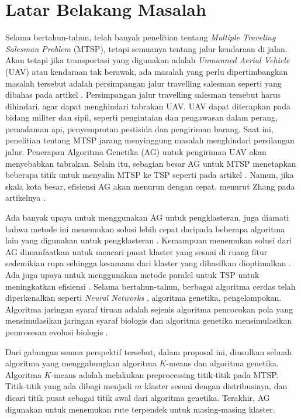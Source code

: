 \section{Latar Belakang Masalah}

Selama bertahun-tahun, telah banyak penelitian tentang \textit{Multiple Traveling Salesman Problem} (MTSP), tetapi semuanya tentang jalur kendaraan di jalan. Akan tetapi jika transportasi yang digunakan adalah \textit{Unmanned Aerial Vehicle} (UAV) atau kendaraan tak berawak, ada masalah yang perlu dipertimbangkan masalah tersebut adalah persimpangan jalur travelling salesman seperti yang dibahas pada artikel \cite{inproceedings}. Persimpangan jalur travelling salesman tersebut harus dihindari, agar dapat menghindari tabrakan UAV. UAV dapat diterapkan pada bidang militer dan sipil, seperti pengintaian dan pengawasan dalam perang, pemadaman api, penyemprotan pestisida dan pengiriman barang.
Saat ini, penelitian tentang MTSP jarang menyinggung masalah menghindari persilangan jalur. Penerapan Algoritma Genetika (AG) untuk pengiriman UAV akan menyebabkan tabrakan. Selain itu, sebagian besar AG untuk MTSP menetapkan beberapa titik untuk menyalin MTSP ke TSP seperti pada artikel \cite{shengping2002hybrid}. Namun, jika skala kota besar, efisiensi AG akan menurun dengan cepat, menurut Zhang pada artikelnya \cite{zhang2014parallel}.

Ada banyak upaya untuk menggunakan AG untuk pengklasteran, juga diamati bahwa metode ini menemukan solusi lebih cepat daripada beberapa algoritma lain yang digunakan untuk pengklasteran \cite{krishna1999genetic}. Kemampuan menemukan solusi dari AG dimanfaatkan untuk mencari pusat klaster yang sesuai di ruang fitur sedemikian rupa sehingga kesamaan dari klaster yang dihasilkan dioptimalkan \cite{maii2000genetic}. Ada juga upaya untuk menggunakan metode paralel untuk TSP untuk meningkatkan efisiensi \cite{li2016parallel}. Selama bertahun-tahun, berbagai algoritma cerdas telah diperkenalkan seperti  \textit{Neural Networks} \cite{song2015asynchronous,zhang2015universality,pan2012spiking}, algoritma genetika, pengelompokan. Algoritma jaringan syaraf tiruan adalah sejenis algoritma pencocokan pola yang mensimulasikan jaringan syaraf biologis dan algoritma genetika mensimulasikan pemrosesan evolusi biologis \cite{liu2015implementation,zeng2014spiking,xu2016probe,zhang2014efficient}.

Dari gabungan semua perspektif tersebut, dalam proposal ini, diusulkan sebuah algoritma yang menggabungkan algoritma $K$-means dan algoritma genetika. Algoritma $K$-means adalah melakukan preprocessing titik-titik pada MTSP. Titik-titik yang ada dibagi menjadi $m$ klaster sesuai dengan distribusinya, dan dicari titik pusat sebagai titik awal dari algoritma genetika. Terakhir, AG digunakan untuk menemukan rute terpendek untuk masing-masing klaster.%
